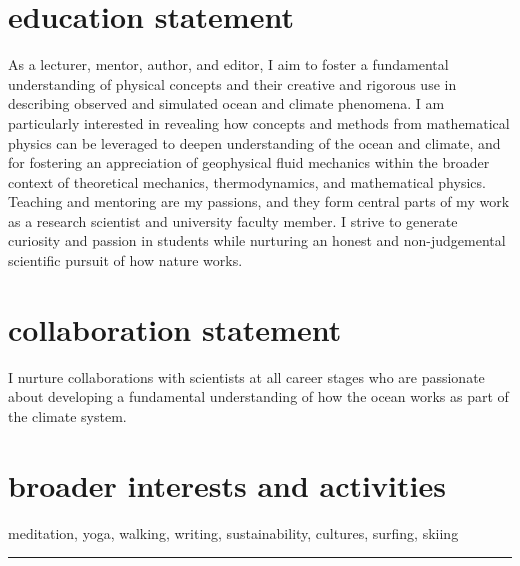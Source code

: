 \documentclass{article}
\begin{document}
\vspace{-.5cm}
\section*{\sc \color{Maroon} education statement}
\vspace{-.3cm}
As a lecturer, mentor, author, and editor, I aim to foster a fundamental understanding of physical concepts and their creative and rigorous use in describing observed and simulated ocean and climate phenomena. I am particularly interested in revealing how concepts and methods from mathematical physics can be leveraged to deepen understanding of the ocean and climate, and for fostering an appreciation of geophysical fluid mechanics within the broader context of theoretical mechanics, thermodynamics, and mathematical physics.  
Teaching and mentoring are my passions, and they form central parts of my work as a research scientist and university faculty member. I strive to generate curiosity and passion in students while nurturing an honest and non-judgemental scientific pursuit of how nature works. 

\vspace{-.5cm}
\section*{\sc  \color{Maroon}  collaboration statement}
\vspace{-.3cm}
I nurture collaborations with scientists at all career stages who are passionate about developing a fundamental  understanding of how the ocean works as part of the climate system. 

\vspace{-.5cm}
\section*{\sc  \color{Maroon}  broader interests and activities}
\vspace{-.3cm}
meditation, yoga, walking, writing, sustainability, cultures, surfing, skiing

\noindent\rule{\textwidth}{1pt}


\vspace{-.2cm}
\end{document}
